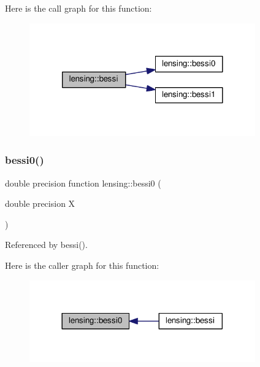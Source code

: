 Here is the call graph for this function\+:
\nopagebreak
\begin{figure}[H]
\begin{center}
\leavevmode
\includegraphics[width=276pt]{namespacelensing_a6849d58625a3e2cf0a2a22371141eb4a_cgraph}
\end{center}
\end{figure}
\mbox{\label{namespacelensing_a19d7fd08c1d4dc42d7e7aad518d14c7a}} 
\subsubsection{\texorpdfstring{bessi0()}{bessi0()}}
{\footnotesize\ttfamily double precision function lensing\+::bessi0 (\begin{DoxyParamCaption}\item[{double precision}]{X }\end{DoxyParamCaption})\hspace{0.3cm}{\ttfamily [private]}}



Referenced by bessi().

Here is the caller graph for this function\+:
\nopagebreak
\begin{figure}[H]
\begin{center}
\leavevmode
\includegraphics[width=276pt]{namespacelensing_a19d7fd08c1d4dc42d7e7aad518d14c7a_icgraph}
\end{center}
\end{figure}
\mbox{\label{namespacelensing_a2474483511401e2796af7b20caf6796d}} 
